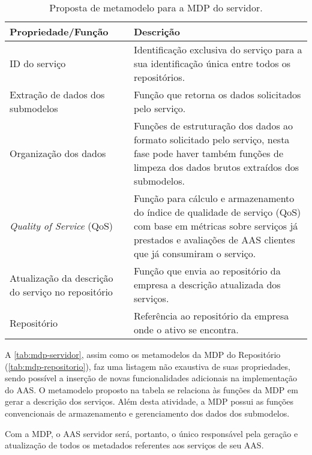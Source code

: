 	\begin{table}[htb]
		\centering
		\caption{Proposta de metamodelo para a MDP do servidor.}
		\label{tab:mdp-servidor}
		\begin{tabular}{p{4cm}p{11cm}}
			\hline
			\textbf{Propriedade/Função}
			& \textbf{Descrição} \\ 
			
			\hline
			ID do serviço
			& Identificação exclusiva do serviço para a sua identificação única entre todos os repositórios. \\
			
			\hline
			Extração de dados dos submodelos
			& Função que retorna os dados solicitados pelo serviço. \\
			
			\hline
			Organização dos dados
			& Funções de estruturação dos dados ao formato solicitado pelo serviço, nesta fase pode haver também funções de limpeza dos dados brutos extraídos dos submodelos. \\
			
			\hline
			\textit{Quality of Service} (QoS)
			& Função para cálculo e armazenamento do índice de qualidade de serviço (QoS) com base em métricas sobre serviços já prestados e avaliações de AAS clientes que já consumiram o serviço. \\
			
			\hline
			Atualização da descrição do serviço no repositório
			& Função que envia ao repositório da empresa a descrição atualizada dos serviços. \\
			
			\hline
			Repositório
			& Referência ao repositório da empresa onde o ativo se encontra. \\			
			\hline
		\end{tabular}
	\end{table}
	
	A \autoref{tab:mdp-servidor}, assim como os metamodelos da MDP do Repositório (\autoref{tab:mdp-repositorio}), faz uma listagem não exaustiva de suas propriedades, sendo possível a inserção de novas funcionalidades adicionais na implementação do AAS. O metamodelo proposto na tabela se relaciona às funções da MDP em gerar a descrição dos serviços. Além desta atividade, a MDP possui as funções convencionais de armazenamento e gerenciamento dos dados dos submodelos.
	
	Com a MDP, o AAS servidor será, portanto, o único responsável pela geração e atualização de todos os metadados referentes aos serviços de seu AAS.

